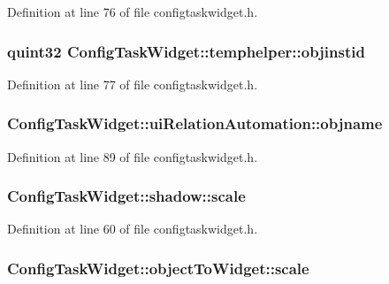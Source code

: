 Definition at line 76 of file configtaskwidget.\-h.

\hypertarget{group___u_a_v_object_widget_utils_ga80a5419befd7432330b2ffb95368f4ed}{
\subsubsection[{objinstid}]{\setlength{\rightskip}{0pt plus 5cm}quint32 Config\-Task\-Widget\-::temphelper\-::objinstid}}\label{group___u_a_v_object_widget_utils_ga80a5419befd7432330b2ffb95368f4ed}


Definition at line 77 of file configtaskwidget.\-h.

\hypertarget{group___u_a_v_object_widget_utils_ga3a6899c9cfb56d74f0bf98300a156bc7}{
\subsubsection[{objname}]{ Config\-Task\-Widget\-::ui\-Relation\-Automation\-::objname}}\label{group___u_a_v_object_widget_utils_ga3a6899c9cfb56d74f0bf98300a156bc7}


Definition at line 89 of file configtaskwidget.\-h.

\hypertarget{group___u_a_v_object_widget_utils_ga06ad87fdaa5af70d7239dda785c76f76}{
\subsubsection[{scale}]{ Config\-Task\-Widget\-::shadow\-::scale}}\label{group___u_a_v_object_widget_utils_ga06ad87fdaa5af70d7239dda785c76f76}


Definition at line 60 of file configtaskwidget.\-h.

\hypertarget{group___u_a_v_object_widget_utils_ga7981e8bb575a90d2a1491fd792108efe}{
\subsubsection[{scale}]{ Config\-Task\-Widget\-::object\-To\-Widget\-::scale}}\label{group___u_a_v_object_widget_utils_ga7981e8bb575a90d2a1491fd792108efe}


